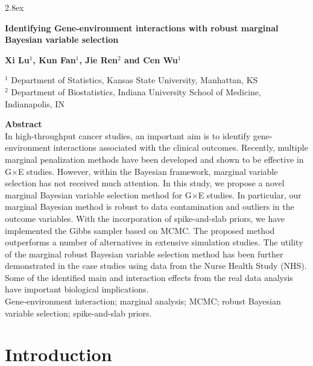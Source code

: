 \documentclass[12pt]{article}
\def\doublespace{\baselineskip=22pt}
\begin{document}
\doublespace
\baselineskip 2.8ex
\begin{center}
{\bf\Huge Identifying Gene-environment interactions with robust marginal Bayesian variable selection }
\doublespace




{\bf Xi Lu$^1$, Kun Fan$^1$, Jie Ren$^2$ and Cen Wu$^{1}$}

{ $^1$ Department of Statistics, Kansas State University, Manhattan, KS}\\

{ $^2$  Department of Biostatistics, Indiana University School of Medicine, Indianapolis, IN}\\


\end{center}
%
%

{\bf\Large Abstract}\\

In high-throughput cancer studies, an important aim is to identify gene-environment interactions associated with the clinical outcomes. Recently, multiple marginal penalization methods have been developed and shown to be effective in G$\times$E studies. However, within the Bayesian framework, marginal variable selection has not received much attention. In this study, we propose a novel marginal Bayesian variable selection method for G$\times$E studies. In particular, our marginal Bayesian method is robust to data contamination and outliers in the outcome variables. With the incorporation of spike-and-slab priors, we have implemented the Gibbs sampler based on MCMC. The proposed method outperforms a number of alternatives in extensive simulation studies. The utility of the marginal robust Bayesian variable selection method has been further demonstrated in the case studies using data from the Nurse Health Study (NHS). Some of the identified main and interaction effects from the real data analysis have important biological implications. \\

 Gene-environment interaction; marginal analysis; MCMC; robust Bayesian variable selection; spike-and-slab priors.

\section{Introduction}
\end{document}
